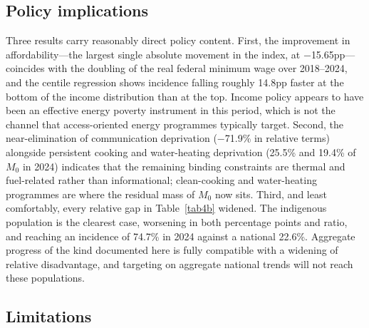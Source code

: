 \documentclass[11pt, a4paper]{article}
\begin{document}
\subsection{Policy implications}

Three results carry reasonably direct policy content. First, the improvement in affordability---the largest single absolute movement in the index, at $-$15.65pp---coincides with the doubling of the real federal minimum wage over 2018--2024, and the centile regression shows incidence falling roughly 14.8pp faster at the bottom of the income distribution than at the top. Income policy appears to have been an effective energy poverty instrument in this period, which is not the channel that access-oriented energy programmes typically target. Second, the near-elimination of communication deprivation ($-$71.9\% in relative terms) alongside persistent cooking and water-heating deprivation (25.5\% and 19.4\% of $M_0$ in 2024) indicates that the remaining binding constraints are thermal and fuel-related rather than informational; clean-cooking and water-heating programmes are where the residual mass of $M_0$ now sits. Third, and least comfortably, every relative gap in Table~\ref{tab4b} widened. The indigenous population is the clearest case, worsening in both percentage points and ratio, and reaching an incidence of 74.7\% in 2024 against a national 22.6\%. Aggregate progress of the kind documented here is fully compatible with a widening of relative disadvantage, and targeting on aggregate national trends will not reach these populations.

\subsection{Limitations}
\end{document}

